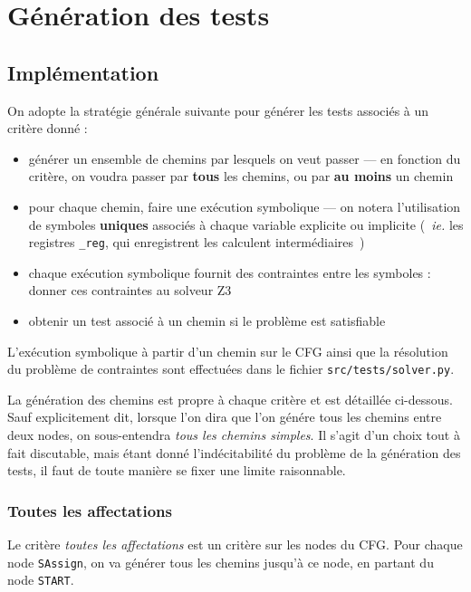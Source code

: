 \chapter{Génération des tests}

\section{Implémentation}

On adopte la stratégie générale suivante pour générer les tests associés à un
critère donné :

\begin{itemize}
	\item générer un ensemble de chemins par lesquels on veut passer --- en
	fonction du critère, on voudra passer par \textbf{tous} les chemins, ou
	par \textbf{au moins} un chemin
	\item pour chaque chemin, faire une exécution symbolique --- on notera
	l'utilisation de symboles \textbf{uniques} associés à chaque variable
	explicite ou implicite (~\textit{ie.} les registres \texttt{\_reg}, qui
	enregistrent les calculent intermédiaires~)
	\item chaque exécution symbolique fournit des contraintes entre les
	symboles : donner ces contraintes au solveur Z3
	\item obtenir un test associé à un chemin si le problème est satisfiable
\end{itemize}

\bigskip

L'exécution symbolique à partir d'un chemin sur le CFG ainsi que la résolution
du problème de contraintes sont effectuées dans le fichier
\texttt{src/tests/solver.py}.

\bigskip

La génération des chemins est propre à chaque critère et est détaillée
ci-dessous. Sauf explicitement dit, lorsque l'on dira que l'on génére tous les
chemins entre deux nodes, on sous-entendra \textit{tous les chemins simples}.
Il s'agit d'un choix tout à fait discutable, mais étant donné l'indécitabilité
du problème de la génération des tests, il faut de toute manière se fixer une
limite raisonnable.

\subsection{Toutes les affectations}

Le critère \textit{toutes les affectations} est un critère sur les nodes du
CFG. Pour chaque node \texttt{SAssign}, on va générer tous les chemins jusqu'à
ce node, en partant du node \texttt{START}.

